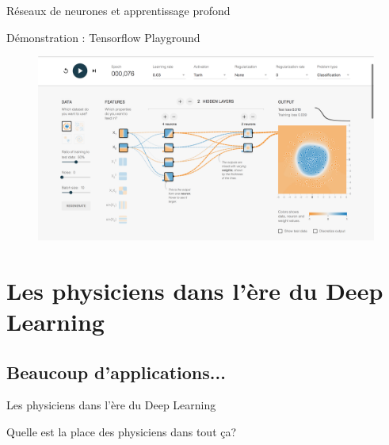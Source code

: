 \documentclass[french]{beamer}
\begin{document}
\begin{frame}{Réseaux de neurones et apprentissage profond}

\vspace{0.5cm}
Démonstration : Tensorflow Playground

\begin{figure}[htbp]
\begin{center}
\href{http://playground.tensorflow.org/}{\includegraphics[width=\textwidth]{figures/tensorflow_playground}}
\end{center}
\end{figure}


\end{frame}

\section{Les physiciens dans l'ère du Deep Learning}

\subsection{Beaucoup d'applications...}

\begin{frame}{Les physiciens dans l'ère du Deep Learning}
\begin{center}
{\Large Quelle est la place des physiciens dans tout ça?}
\end{center}
\end{frame}
\end{document}
